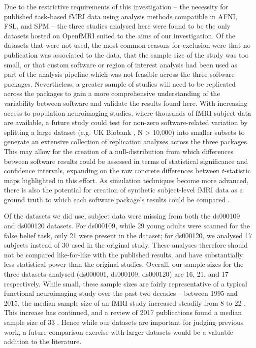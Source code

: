 Due to the restrictive requirements of this investigation -- the necessity for published task-based fMRI data using analysis methods compatible in AFNI, FSL, and SPM -- the three studies analysed here were found to be the only datasets hosted on OpenfMRI suited to the aims of our investigation. Of the datasets that were not used, the most common reasons for exclusion were that no publication was associated to the data, that the sample size of the study was too small, or that custom software or region of interest analysis had been used as part of the analysis pipeline which was not feasible across the three software packages. Nevertheless, a greater sample of studies will need to be replicated across the packages to gain a more comprehensive understanding of the variability between software and validate the results found here. With increasing access to population neuroimaging studies, where thousands of fMRI subject data are available, a future study could test for non-zero software-related variation by splitting a large dataset (e.g. UK Biobank \citep{Alfaro-Almagro2018-ip}, N > 10,000) into smaller subsets to generate an extensive collection of replication analyses across the three packages. This may allow for the creation of a null-distribution from which differences between software results could be assessed in terms of statistical significance and confidence intervals, expanding on the raw concrete differences between $t$-statistic maps highlighted in this effort. As simulation techniques become more advanced, there is also the potential for creation of synthetic subject-level fMRI data as a ground truth to which each software package's results could be compared \citep{Ellis2019-zi}. 

Of the datasets we did use, subject data were missing from both the ds000109 and ds000120 datasets. For ds000109, while 29 young adults were scanned for the false belief task, only 21 were present in the dataset; for ds000120, we analysed 17 subjects instead of 30 used in the original study. These analyses therefore should not be compared like-for-like with the published results, and have substantially less statistical power than the original studies. Overall, our sample sizes for the three datasets analysed (ds000001, ds000109, ds000120) are 16, 21, and 17 respectively. While small, these sample sizes are fairly representative of a typical functional neuroimaging study over the past two decades -- between 1995 and 2015, the median sample size of an fMRI study increased steadily from 8 to 22 \citep{Poldrack2017-rr}. This increase has continued, and a review of 2017 publications found a median sample size of 33 \citep{Yeung2018-kr}. Hence while our datasets are important for judging previous work, a future comparison exercise with larger datasets would be a valuable addition to the literature.


